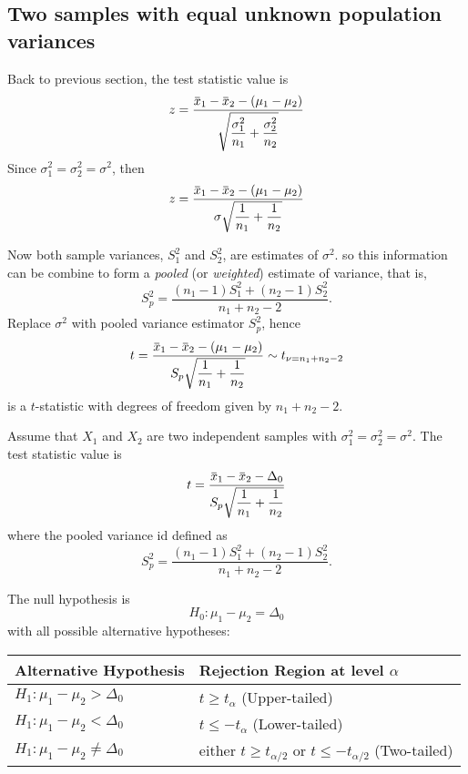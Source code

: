 \subsection{Two samples with equal unknown population variances}

Back to previous section, the test statistic value is 
\[
    z = \frac{\ols{x}_1 - \ols{x}_2 - (\mu_1 - \mu_2)}{\sqrt{\displaystyle \frac{\sigma_1^2}{n_1} + \frac{\sigma_2^2}{n_2}}}
\]
Since $\sigma^2_1 = \sigma^2_2 = \sigma^2$, then
\[
    z = \frac{\ols{x}_1 - \ols{x}_2 - (\mu_1 - \mu_2)}{\sigma \sqrt{\displaystyle \frac{1}{n_1} + \frac{1}{n_2}}}
\]

Now both sample variances, $S^2_1$ and $S^2_2$, are estimates of $\sigma^2$. so this 
information can be combine to form a \textit{pooled} (or \textit{weighted}) estimate of variance, that is,
\[
    S^2_p = \frac{(n_1 - 1)S^2_1 + (n_2 - 1)S^2_2}{n_1 + n_2 - 2}.
\] 
Replace $\sigma^2$ with pooled variance estimator $S^2_p$, hence 
\[
    t = \frac{\ols{x}_1 - \ols{x}_2 - (\mu_1 - \mu_2)}{S_p \sqrt{\displaystyle \frac{1}{n_1} + \frac{1}{n_2}}} \sim t_{\nu=n_1+n_2-2}
\]
is a $t$-statistic with degrees of freedom given by $n_1 + n_2 - 2$.

\begin{definition}
    Assume that $X_1$ and $X_2$ are two independent samples with 
    $\sigma^2_1 = \sigma^2_2 = \sigma^2$. The test statistic value is
    \begin{equation}
    t = \frac{\ols{x}_1 - \ols{x}_2 - \Delta_0}{S_p \sqrt{\displaystyle \frac{1}{n_1} + \frac{1}{n_2}}}
    \end{equation}
    where the pooled variance id defined as
    \begin{equation}
        S^2_p = \frac{(n_1 - 1)S^2_1 + (n_2 - 1)S^2_2}{n_1 + n_2 - 2}.
    \end{equation}

    The null hypothesis is
    \[
        H_0 : \mu_1 - \mu_2 = \Delta_0
    \]
    with all possible alternative hypotheses:

    \renewcommand{\arraystretch}{1.2}
    \begin{tabularx}{\textwidth}{|l|X|}
    \hline
    Alternative Hypothesis & Rejection Region at level $\alpha$\\
    \hline
    $H_1 : \mu_1 - \mu_2 > \Delta_0$ & $t \geq t_\alpha$ (Upper-tailed)\\
    \hline
    $H_1 : \mu_1 - \mu_2 < \Delta_0$ & $t \leq -t_\alpha$ (Lower-tailed)\\
    \hline
    $H_1 : \mu_1 - \mu_2 \neq \Delta_0$ & either $t \geq t_{\alpha/2}$ or $t \leq -t_{\alpha/2}$ (Two-tailed)\\
    \hline
    \end{tabularx}
\end{definition}

